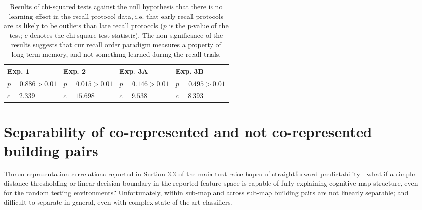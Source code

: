 \begin{table}
	\centering
	\begin{tabularx}{\textwidth}{XXXX}
		\textbf{Exp. 1} & \textbf{Exp. 2} & \textbf{Exp. 3A}  & \textbf{Exp. 3B} \\ \hline
		$p=0.886 > 0.01$ & $p=0.015 > 0.01$ & $p=0.146 > 0.01$ & $p=0.495 > 0.01$  \\
		$c=2.339$ & $c=15.698$ & $c=9.538$ & $c=8.393$  \\ \hline
	\end{tabularx}
	\caption{Results of chi-squared tests against the null hypothesis that there is no learning effect in the recall protocol data, i.e. that early recall protocols are as likely to be outliers than late recall protocols ($p$ is the p-value of the test; $c$ denotes the chi square test statistic). The non-significance of the results suggests that our recall order paradigm measures a property of long-term memory, and not something learned during the recall trials.}
	\label{tbl_chisq}
\end{table}

\section{Separability of co-represented and not co-represented building pairs}

The co-representation correlations reported in Section 3.3 of the main text raise hopes of straightforward predictability - what if a simple distance thresholding or linear decision boundary in the reported feature space is capable of fully explaining cognitive map structure, even for the random testing environments? Unfortunately, within sub-map and across sub-map building pairs are not linearly separable; and difficult to separate in general, even with complex state of the art classifiers. 


